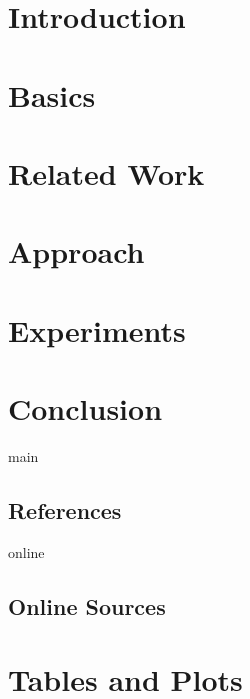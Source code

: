 \documentclass[11pt,a4paper]{report}
\begin{document}
    \chapter{Introduction}
    \label{ch:1_introduction}
    


    \chapter{Basics}
    \label{ch:2_basics}
    


    \chapter{Related Work}
    \label{ch:3_related_work}
    


    \chapter{Approach}
    \label{ch:4_approach}
    


    \chapter{Experiments}
    \label{ch:5_experiments}
    


    \chapter{Conclusion}
    \label{ch:6_conclusion}
    

    \newpage

    

    \begin{btSect}{main}
        \section*{References}
        \btPrintCited
    \end{btSect}

    \begin{btSect}{online}
        \section*{Online Sources}
        \btPrintCited
    \end{btSect}


    \appendix


    \chapter{Tables and Plots}
    \label{ch:a_appendix}
    
\end{document}
